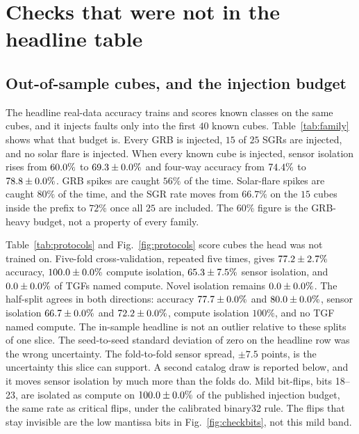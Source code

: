 \documentclass{ieeeaccess}
\begin{document}
\section{Checks that were not in the headline table}
\label{sec:extra}

\subsection{Out-of-sample cubes, and the injection budget}

The headline real-data accuracy trains and scores known classes on the same cubes, and it injects faults only into the first $40$ known cubes. Table~\ref{tab:family} shows what that budget is. Every GRB is injected, $15$ of $25$ SGRs are injected, and no solar flare is injected. When every known cube is injected, sensor isolation rises from $60.0\%$ to $69.3\pm0.0\%$ and four-way accuracy from $74.4\%$ to $78.8\pm0.0\%$. GRB spikes are caught $56\%$ of the time. Solar-flare spikes are caught $80\%$ of the time, and the SGR rate moves from $66.7\%$ on the $15$ cubes inside the prefix to $72\%$ once all $25$ are included. The $60\%$ figure is the GRB-heavy budget, not a property of every family.



Table~\ref{tab:protocols} and Fig.~\ref{fig:protocols} score cubes the head was not trained on. Five-fold cross-validation, repeated five times, gives $77.2\pm2.7\%$ accuracy, $100.0\pm0.0\%$ compute isolation, $65.3\pm7.5\%$ sensor isolation, and $0.0\pm0.0\%$ of TGFs named compute. Novel isolation remains $0.0\pm0.0\%$. The half-split agrees in both directions: accuracy $77.7\pm0.0\%$ and $80.0\pm0.0\%$, sensor isolation $66.7\pm0.0\%$ and $72.2\pm0.0\%$, compute isolation $100\%$, and no TGF named compute. The in-sample headline is not an outlier relative to these splits of one slice. The seed-to-seed standard deviation of zero on the headline row was the wrong uncertainty. The fold-to-fold sensor spread, $\pm 7.5$ points, is the uncertainty this slice can support. A second catalog draw is reported below, and it moves sensor isolation by much more than the folds do. Mild bit-flips, bits 18--23, are isolated as compute on $100.0\pm0.0\%$ of the published injection budget, the same rate as critical flips, under the calibrated binary32 rule. The flips that stay invisible are the low mantissa bits in Fig.~\ref{fig:checkbits}, not this mild band.


\end{document}
